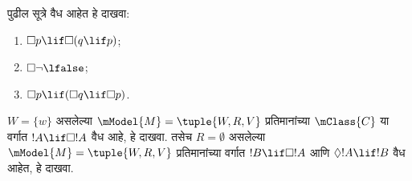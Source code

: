 \documentclass[../../../include/open-logic-section]{subfiles}
\begin{document}
\begin{prob}
  पुढील सूत्रे वैध आहेत हे दाखवा:
  \begin{enumerate}
  \item $\Box p \lif \Box (q \lif p)$;
  \item $\Box \lnot \lfalse$;
  \item $\Box p \lif (\Box q \lif \Box p)$.
  \end{enumerate}
\end{prob}

\begin{prob}
  $W = \{w\}$ असलेल्या $\mModel{M} = \tuple{W, R, V}$
  प्रतिमानांच्या $\mClass{C}$ या वर्गात $!A \lif \Box!A$
  वैध आहे, हे दाखवा. तसेच $R = \emptyset$ असलेल्या
  $\mModel{M} = \tuple{W, R, V}$ प्रतिमानांच्या वर्गात
  $!B \lif \Box !A$ आणि $\Diamond !A \lif !B$ वैध
  आहेत, हे दाखवा.
\end{prob}
\end{document}
